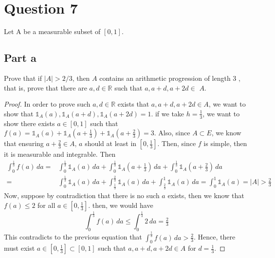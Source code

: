 \section{Question 7}

\begin{question}
    [10 points] Let A be a measurable subset of $[0,1]$.
\end{question}

\subsection{Part a}

\begin{question}
    Prove that if $|A|>2 / 3$, then $A$ contains an arithmetic progression of length 3 , that is, prove that there are $a, d \in \mathbb{R}$ such that $a, a+d, a+2 d \in$ $A$.
\end{question}

\begin{answer}
    \begin{proof}
        In order to prove such $a,d \in \mathbb{R}$ exists that $a, a+d, a+2d \in A$, we want to show that $\mathbb{1}_A(a), \mathbb{1}_A(a+d),\mathbb{1}_A(a+2d) = 1$. if we take $h = \tfrac{1}{3}$, we want to show there exists $a\in [0,1]$ such that $f(a) = \mathbb{1}_A(a) + \mathbb{1}_A(a+\tfrac{1}{3}) + \mathbb{1}_A(a+\tfrac{2}{3}) = 3$. Also, since $A \subset E$, we know that ensuring $a+\tfrac{2}{3} \in A$, $a$ should at least in $[0,\tfrac{1}{3}]$. Then, since $f$ is simple, then it is measurable and integrable. Then
        \begin{equation}
            \begin{aligned}
                \int_0^{\frac{1}{3}} f(a) \,da =&\int_0^{\frac{1}{3}} \mathbb{1}_A(a)\,da + \int_0^{\frac{1}{3}} \mathbb{1}_A(a+\tfrac{1}{3})\,da +\int_0^{\frac{1}{3}} \mathbb{1}_A(a+\tfrac{2}{3})\,da\\
                = &\int_0^{\frac{1}{3}} \mathbb{1}_A(a)\,da + \int_{\frac{1}{3}}^{\frac{2}{3}}\mathbb{1}_A(a)\,da + \int_{\frac{2}{3}}^{1}\mathbb{1}_A(a) \,da = \int_0^{1} \mathbb{1}_A(a) = \lvert A \rvert > \tfrac{2}{3}
            \end{aligned}
        \end{equation}
        Now, suppose by contradiction that there is no such $a$ exists, then we know that $f(a) \leq 2$ for all $a \in [0,\tfrac{1}{3}]$. then, we would have 
        \begin{equation}
             \int_0^{\frac{1}{3}} f(a) \,da \leq  \int_0^{\frac{1}{3}} 2 \,da = \tfrac{2}{3}
        \end{equation}
        This contradicts to the previous equation that $ \int_0^{\frac{1}{3}} f(a) \,da > \tfrac{2}{3}$. Hence, there must exist $a \in [0,\tfrac{1}{3}] \subset [0,1]$ such that $a, a+d,a+2d \in A$ for $d = \tfrac{1}{3}$.
    \end{proof}
\end{answer}

